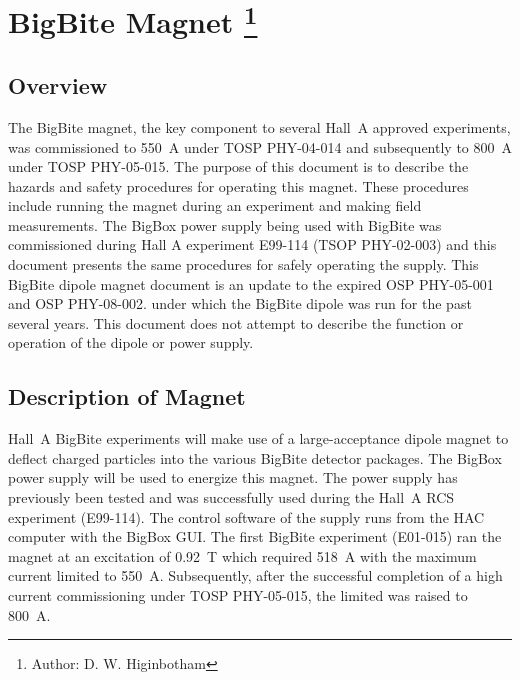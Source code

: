 %
%
%
%       
%


\chapter[BigBite Magnet]{BigBite Magnet
\footnote{Author: D. W. Higinbotham }
}

\section{Overview}
The BigBite magnet, the key component to several Hall~A approved experiments, was 
commissioned to 550~A under TOSP PHY-04-014 and subsequently to 
800~A under TOSP PHY-05-015. 
The purpose of this document is to describe the hazards 
and safety procedures for operating this magnet.  These procedures include running 
the magnet during an experiment and making field measurements.  
The BigBox power supply being used with BigBite was commissioned during 
Hall A experiment E99-114 (TSOP PHY-02-003) and this document presents 
the same procedures for safely operating the supply.  
This BigBite dipole magnet document is an update to the expired OSP PHY-05-001
and OSP PHY-08-002. 
under which the BigBite dipole was run for the past several years.
This document does not attempt to describe the function or operation of the dipole or
power supply. 

\section{Description of Magnet}

Hall~A BigBite experiments will make use of a large-acceptance dipole magnet 
to deflect charged particles into the various BigBite detector packages.  
The BigBox power supply will be used to energize this magnet.  
The power supply has previously been tested and was successfully 
used during the Hall~A RCS experiment (E99-114).
The control software of the supply runs from the HAC computer with the BigBox GUI.  
The first BigBite experiment (E01-015) ran the magnet at an excitation 
of 0.92~T which required 518~A with the maximum current limited to
550~A.  Subsequently, after the successful completion of a high current 
commissioning under TOSP PHY-05-015, the limited was raised to 800~A.


